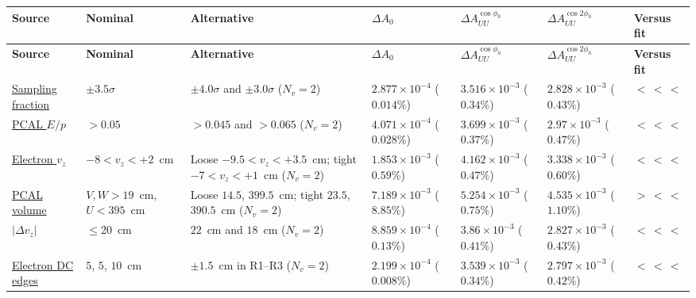 \nolinenumbers
\begingroup
\footnotesize
\setlength{\tabcolsep}{2.5pt}
\begin{longtable}{|p{2.45cm}|p{3.20cm}|p{3.35cm}|p{1.55cm}|p{1.55cm}|p{1.55cm}|p{1.15cm}|}
\hline
\textbf{Source} & \textbf{Nominal} & \textbf{Alternative} & $\Delta A_{0}$ & $\Delta A_{UU}^{\cos\phi_h}$ & $\Delta A_{UU}^{\cos 2\phi_h}$ & \textbf{Versus fit} \\
\hline
\endfirsthead
\hline
\textbf{Source} & \textbf{Nominal} & \textbf{Alternative} & $\Delta A_{0}$ & $\Delta A_{UU}^{\cos\phi_h}$ & $\Delta A_{UU}^{\cos 2\phi_h}$ & \textbf{Versus fit} \\
\hline
\endhead
\hyperref[sys-sf-band]{Sampling fraction}& $\pm 3.5\sigma$& $\pm 4.0\sigma$ and $\pm 3.0\sigma$ (\(N_{v} = 2\)) & $2.877\times 10^{-4}$ {\scriptsize($0.014\%$)} & $3.516\times 10^{-3}$ {\scriptsize($0.34\%$)} & $2.828\times 10^{-3}$ {\scriptsize($0.43\%$)} & $<\,<\,<$ \\
\hline
\hyperref[sys-pcal-ep]{PCAL $E/p$}& $>0.05$& $>0.045$ and $>0.065$ (\(N_{v} = 2\)) & $4.071\times 10^{-4}$ {\scriptsize($0.028\%$)} & $3.699\times 10^{-3}$ {\scriptsize($0.37\%$)} & $2.97\times 10^{-3}$ {\scriptsize($0.47\%$)} & $<\,<\,<$ \\
\hline
\hyperref[sys-vz-el]{Electron $v_{z}$}& $-8<v_{z}<+2$~cm& Loose $-9.5<v_{z}<+3.5$~cm; tight $-7<v_{z}<+1$~cm (\(N_{v} = 2\)) & $1.853\times 10^{-3}$ {\scriptsize($0.59\%$)} & $4.162\times 10^{-3}$ {\scriptsize($0.47\%$)} & $3.338\times 10^{-3}$ {\scriptsize($0.60\%$)} & $<\,<\,<$ \\
\hline
\hyperref[sys-pcal-vol]{PCAL volume}& $V,W>19$~cm, $U<395$~cm& Loose $14.5$, $399.5$~cm; tight $23.5$, $390.5$~cm (\(N_{v} = 2\)) & $7.189\times 10^{-3}$ {\scriptsize($8.85\%$)} & $5.254\times 10^{-3}$ {\scriptsize($0.75\%$)} & $4.535\times 10^{-3}$ {\scriptsize($1.10\%$)} & $>\,<\,<$ \\
\hline
\hyperref[sys-dvz]{$|\Delta v_{z}|$}& $\le 20$~cm& $22$~cm and $18$~cm (\(N_{v} = 2\)) & $8.859\times 10^{-4}$ {\scriptsize($0.13\%$)} & $3.86\times 10^{-3}$ {\scriptsize($0.41\%$)} & $2.827\times 10^{-3}$ {\scriptsize($0.43\%$)} & $<\,<\,<$ \\
\hline
\hyperref[sys-dcfid-el]{Electron DC edges}& $5$, $5$, $10$~cm& $\pm 1.5$~cm in R1--R3 (\(N_{v} = 2\)) & $2.199\times 10^{-4}$ {\scriptsize($0.008\%$)} & $3.539\times 10^{-3}$ {\scriptsize($0.34\%$)} & $2.797\times 10^{-3}$ {\scriptsize($0.42\%$)} & $<\,<\,<$ \\

\end{longtable}
